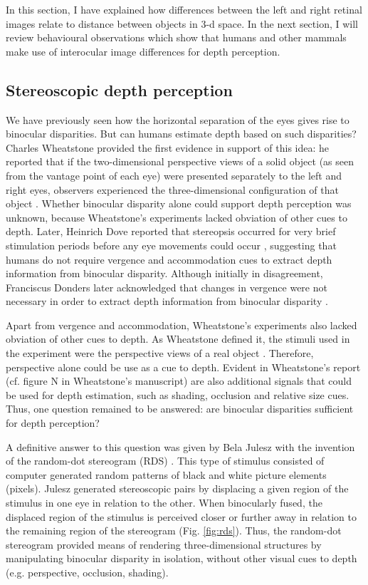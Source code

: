 In this section, I have explained how differences between the left and right retinal images relate to distance between objects in 3-d space. In the next section, I will review behavioural observations which show that humans and other mammals make use of interocular image differences for depth perception.

\subsection{Stereoscopic depth perception}

We have previously seen how the horizontal separation of the eyes gives rise to binocular disparities. But can humans estimate depth based on such disparities? Charles Wheatstone provided the first evidence in support of this idea: he reported that if the two-dimensional perspective views of a solid object (as seen from the vantage point of each eye) were presented separately to the left and right eyes, observers experienced the three-dimensional configuration of that object \cite{Wheatstone:1838xf}. Whether binocular disparity alone could support depth perception was unknown, because Wheatstone's experiments lacked obviation of other cues to depth. Later, Heinrich Dove reported that stereopsis occurred for very brief stimulation periods before any eye movements could occur \cite{Dove1841,Dove1860}, suggesting that humans do not require vergence and accommodation cues to extract depth information from binocular disparity. Although initially in disagreement, Franciscus Donders later acknowledged that changes in vergence were not necessary in order to extract depth information from binocular disparity \cite{Donders1867}.

Apart from vergence and accommodation, Wheatstone's experiments also lacked obviation of other cues to depth. As Wheatstone defined it, the stimuli used in the experiment were the perspective views of a real object \cite{Wheatstone:1838xf}. Therefore, perspective alone could be use as a cue to depth. Evident in Wheatstone's report \cite{Wheatstone:1838xf} (cf. figure N in Wheatstone's manuscript) are also additional signals that could be used for depth estimation, such as shading, occlusion and relative size cues. Thus, one question remained to be answered: are binocular disparities sufficient for depth perception?

A definitive answer to this question was given by Bela Julesz with the invention of the random-dot stereogram (RDS) \cite{JULESZ:1964ff}. This type of stimulus consisted of computer generated random patterns of black and white picture elements (pixels). Julesz generated stereoscopic pairs by displacing a given region of the stimulus in one eye in relation to the other. When binocularly fused, the displaced region of the stimulus is perceived closer or further away in relation to the remaining region of the stereogram (Fig. \ref{fig:rds}). Thus, the random-dot stereogram provided means of rendering three-dimensional structures by manipulating binocular disparity in isolation, without other visual cues to depth (e.g. perspective, occlusion, shading).

